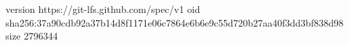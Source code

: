 version https://git-lfs.github.com/spec/v1
oid sha256:37a90cdb92a37b14d8f1171e06c7864e6b6e9c55d720b27aa40f3dd3bf838d98
size 2796344
